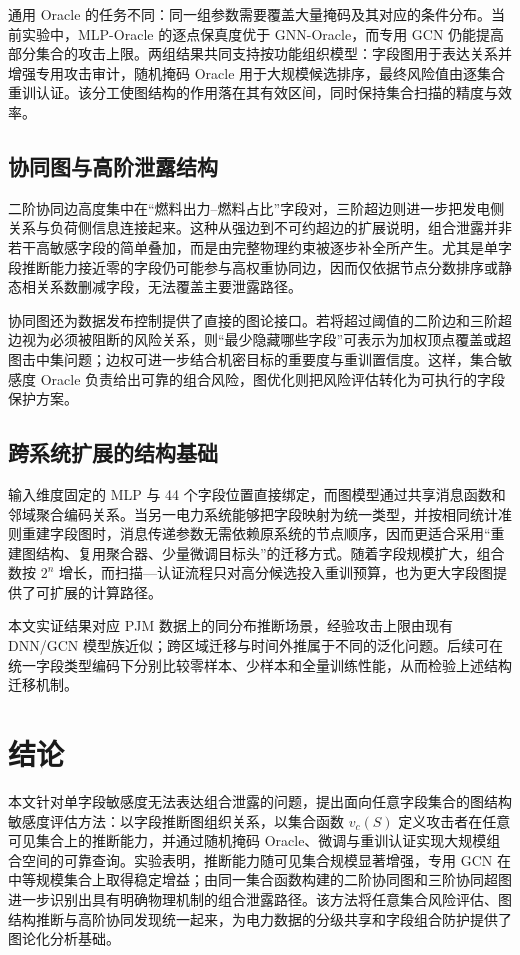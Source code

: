 \documentclass[UTF8,a4paper,zihao=5,fontset=fandol]{ctexart}
\begin{document}
通用 Oracle 的任务不同：同一组参数需要覆盖大量掩码及其对应的条件分布。当前实验中，MLP-Oracle 的逐点保真度优于 GNN-Oracle，而专用 GCN 仍能提高部分集合的攻击上限。两组结果共同支持按功能组织模型：字段图用于表达关系并增强专用攻击审计，随机掩码 Oracle 用于大规模候选排序，最终风险值由逐集合重训认证。该分工使图结构的作用落在其有效区间，同时保持集合扫描的精度与效率。

\subsection{协同图与高阶泄露结构}

二阶协同边高度集中在“燃料出力--燃料占比”字段对，三阶超边则进一步把发电侧关系与负荷侧信息连接起来。这种从强边到不可约超边的扩展说明，组合泄露并非若干高敏感字段的简单叠加，而是由完整物理约束被逐步补全所产生。尤其是单字段推断能力接近零的字段仍可能参与高权重协同边，因而仅依据节点分数排序或静态相关系数删减字段，无法覆盖主要泄露路径。

协同图还为数据发布控制提供了直接的图论接口。若将超过阈值的二阶边和三阶超边视为必须被阻断的风险关系，则“最少隐藏哪些字段”可表示为加权顶点覆盖或超图击中集问题；边权可进一步结合机密目标的重要度与重训置信度。这样，集合敏感度 Oracle 负责给出可靠的组合风险，图优化则把风险评估转化为可执行的字段保护方案。

\subsection{跨系统扩展的结构基础}

输入维度固定的 MLP 与 44 个字段位置直接绑定，而图模型通过共享消息函数和邻域聚合编码关系\citep{battaglia2018relational,hamilton2017graphsage}。当另一电力系统能够把字段映射为统一类型，并按相同统计准则重建字段图时，消息传递参数无需依赖原系统的节点顺序，因而更适合采用“重建图结构、复用聚合器、少量微调目标头”的迁移方式。随着字段规模扩大，组合数按 $2^n$ 增长，而扫描—认证流程只对高分候选投入重训预算，也为更大字段图提供了可扩展的计算路径。

本文实证结果对应 PJM 数据上的同分布推断场景，经验攻击上限由现有 DNN/GCN 模型族近似；跨区域迁移与时间外推属于不同的泛化问题。后续可在统一字段类型编码下分别比较零样本、少样本和全量训练性能，从而检验上述结构迁移机制。

\section{结论}

本文针对单字段敏感度无法表达组合泄露的问题，提出面向任意字段集合的图结构敏感度评估方法：以字段推断图组织关系，以集合函数 $v_c(S)$ 定义攻击者在任意可见集合上的推断能力，并通过随机掩码 Oracle、微调与重训认证实现大规模组合空间的可靠查询。实验表明，推断能力随可见集合规模显著增强，专用 GCN 在中等规模集合上取得稳定增益；由同一集合函数构建的二阶协同图和三阶协同超图进一步识别出具有明确物理机制的组合泄露路径。该方法将任意集合风险评估、图结构推断与高阶协同发现统一起来，为电力数据的分级共享和字段组合防护提供了图论化分析基础。


\end{document}
